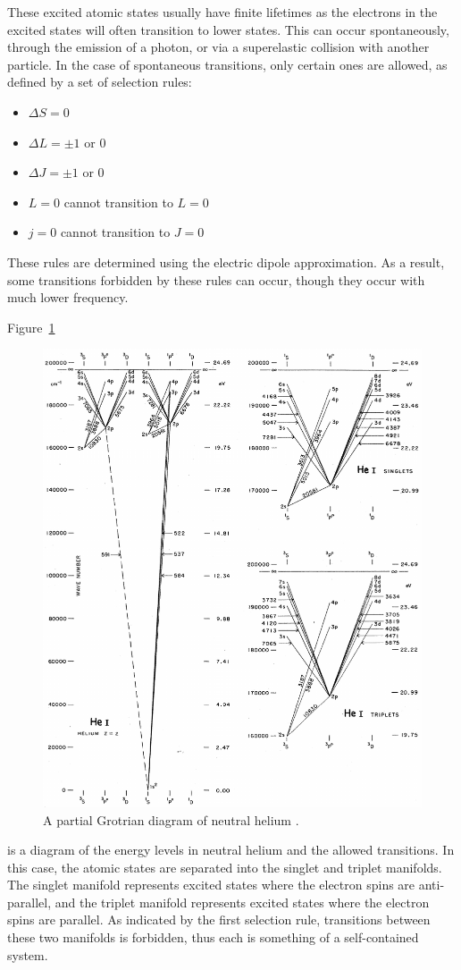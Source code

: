 These excited atomic states usually have finite lifetimes as the electrons in
the excited states will often transition to lower states. This can occur
spontaneously, through the emission of a photon, or via a superelastic collision
with another particle. In the case of spontaneous transitions, only certain ones
are allowed, as defined by a set of selection rules:
\begin{itemize}
  \item $\Delta S = 0$
  \item $\Delta L = \pm1$ or 0
  \item $\Delta J = \pm1$ or 0
  \item $L=0$ cannot transition to $L=0$
  \item $j=0$ cannot transition to $J=0$
\end{itemize}
These rules are determined using the electric dipole approximation. As a result,
some transitions forbidden by these rules can occur, though they occur with much
lower frequency.

Figure~\ref{fig:grotrian}
\begin{figure}
  \centering
  \includegraphics{./chapters/theory/figures/grotrian.pdf}
  \caption{A partial Grotrian diagram of neutral helium \cite{Moore1968}.}
  \label{fig:grotrian}
\end{figure}
is a diagram of the energy levels in neutral helium and the allowed transitions.
In this case, the atomic states are separated into the singlet and triplet
manifolds. The singlet manifold represents excited states where the electron
spins are anti-parallel, and the triplet manifold represents excited states
where the electron spins are parallel. As indicated by the first selection rule,
transitions between these two manifolds is forbidden, thus each is something of
a self-contained system.

